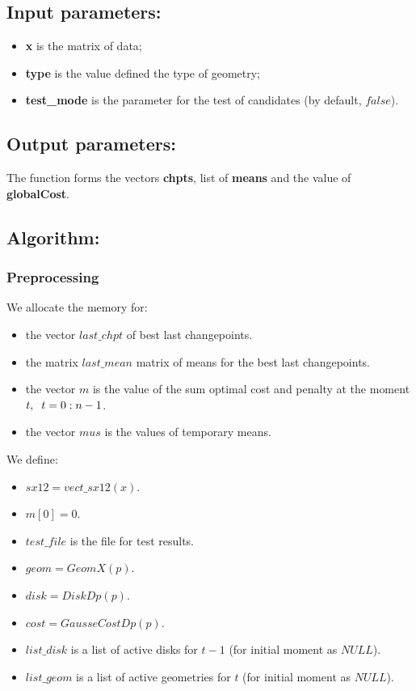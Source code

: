 \documentclass{report}
\begin{document}
	\subsection*{Input parameters:}

	\begin{itemize}
		\item {\bfseries x} is the matrix of data;
		\item {\bfseries type} is the value defined the type of geometry;
		\item {\bfseries test\_mode}  is the parameter for the test of candidates (by default, $false$).
	\end{itemize}

	\subsection*{Output parameters:}

	The function forms the vectors {\bfseries chpts}, list of {\bfseries means} and the value of {\bfseries globalCost}.

	\subsection*{Algorithm:}

	\subsubsection*{Preprocessing}
		
	We allocate the memory for: 
	\begin{itemize}
		\item the vector $last\_chpt$ of best last changepoints.
		\item the matrix $last\_mean$ matrix of means for the best last changepoints.
		\item the vector  $m$ is the value of the sum optimal cost and penalty at the moment $t,  \hspace*{2mm} t = 0:n-1$.
		\item the vector  $mus$ is the values of temporary means.
	\end{itemize}
	We define:
	\begin{itemize}
		\item $sx12 = vect\_sx12(x)$.	
		\item $m[0] = 0$.
		\item $test\_file$ is the file for test results.
		\item $geom = GeomX(p)$.
		\item $disk = DiskDp(p)$.
		\item $cost = GausseCostDp(p)$.
		\item $list\_disk$ is a list of active disks for $t-1$ (for initial moment as $NULL$).
		\item $list\_geom$ is a list of active geometries for $t$ (for initial moment as $NULL$).
	\end{itemize}	
\end{document}
